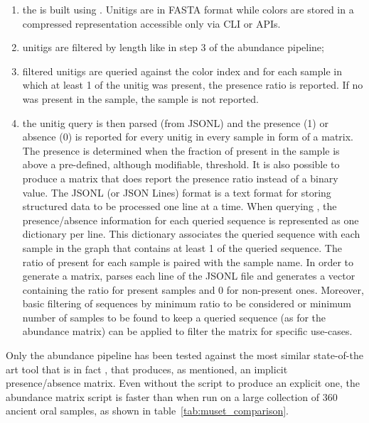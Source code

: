 \begin{enumerate}
	\item the \ccdbg is built using \ggcat. Unitigs are in FASTA format while colors are stored in a compressed representation accessible only via \ggcat \gls{CLI} or \gls{API}s.
	\item unitigs are filtered by length like in step 3 of the abundance pipeline;
	\item filtered unitigs are queried against the \ggcat color index and for each sample in which at least 1 \kmer of the unitig was present, the presence ratio is reported. If no \kmer was present in the sample, the sample is not reported.
	\item the unitig query is then parsed (from JSONL) and the presence (1) or absence (0) is reported for every unitig in every sample in form of a matrix. The presence is determined when the fraction of present \kmers in the sample is above a pre-defined, although modifiable, threshold. It is also possible to produce a matrix that does report the presence ratio instead of a binary value. The JSONL (or JSON Lines) format is a text format for storing structured data to be processed one line at a time. When querying \ggcat, the presence/absence information for each queried sequence is represented as one dictionary per line. This dictionary associates the queried sequence with each sample in the graph that contains at least 1 \kmer of the queried sequence. The ratio of \kmers present for each sample is paired with the sample name. In order to generate a matrix, \muset parses each line of the JSONL file and generates a vector containing the ratio for present samples and 0 for non-present ones. Moreover, basic filtering of sequences by minimum ratio to be considered or minimum number of samples to be found to keep a queried sequence (as for the abundance matrix) can be applied to filter the matrix for specific use-cases.
\end{enumerate}
Only the abundance pipeline has been tested against the most similar state-of-the art tool that is in fact \ggcat, that produces, as mentioned, an implicit presence/absence matrix. Even without the \muset script to produce an explicit one, the abundance matrix script is faster than \ggcat when run on a large collection of 360 ancient oral samples, as shown in table~\ref{tab:muset_comparison}.\\
